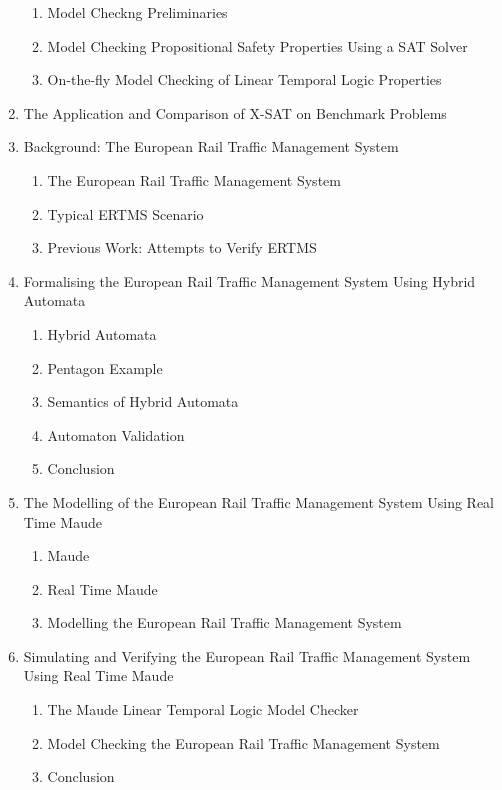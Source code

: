 \documentclass{article}
\begin{document}
\begin{enumerate}
\begin{enumerate}[label*=\arabic*.]
\item Model Checkng Preliminaries 
\item Model Checking Propositional Safety Properties Using a SAT Solver
\item On-the-fly Model Checking of Linear Temporal Logic Properties 
\end{enumerate}
\item The Application and Comparison of X-SAT on Benchmark Problems 
\item Background: The European Rail Traffic Management System 
\begin{enumerate}[label*=\arabic*.]
\item The European Rail Traffic Management System 
\item Typical ERTMS Scenario
\item Previous Work: Attempts to Verify ERTMS
\end{enumerate}
\item Formalising the European Rail Traffic Management System Using Hybrid
Automata 
\begin{enumerate}[label*=\arabic*.]
\item Hybrid Automata 
\item Pentagon Example 
\item Semantics of Hybrid Automata
\item Automaton Validation 
\item Conclusion 
\end{enumerate}
\item The Modelling of the European Rail Traffic Management System Using
Real Time Maude 
\begin{enumerate}[label*=\arabic*.]
\item Maude 
\item Real Time Maude 
\item Modelling the European Rail Traffic Management System 
\end{enumerate}
\item Simulating and Verifying the European Rail Traffic Management System
Using Real Time Maude
\begin{enumerate}[label*=\arabic*.]
\item The Maude Linear Temporal Logic Model Checker 
\item Model Checking the European Rail Traffic Management System 
\item Conclusion
\end{enumerate}
\end{enumerate}
\end{document}
